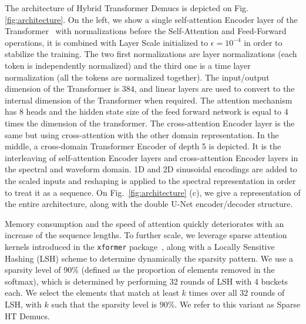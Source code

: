 \documentclass{article}
\begin{document}
The architecture of Hybrid Transformer Demucs is depicted on Fig.\ref{fig:architecture}. On the left, we show a single self-attention Encoder layer of the Transformer~\cite{transformer} with normalizations before the Self-Attention and Feed-Forward operations, it is combined with Layer Scale \cite{layerscale} initialized to $\epsilon{=}10^{-4}$ in order to stabilize the training. The two first normalizations are layer normalizations (each token is independently normalized) and the third one is a time layer normalization (all the tokens are normalized together). 
The input/output dimension of the Transformer is $384$, and linear layers are used to convert to the internal
dimension of the Transformer when required.
The attention mechanism has 8 heads and the hidden state size of the feed forward network is equal to 4 times the dimension of the transformer. The cross-attention Encoder layer is the same but using cross-attention with the other domain representation. In the middle, a cross-domain Transformer Encoder of depth 5 is depicted. It is the interleaving of self-attention Encoder layers and cross-attention Encoder layers in the spectral and waveform domain. 1D \cite{transformer} and 2D \cite{2Dpe} sinusoidal encodings are added to the scaled inputs and reshaping is applied to the spectral representation in order to treat it as a sequence. On Fig.~\ref{fig:architecture} (c), we give
a representation of the entire architecture, along with the double U-Net encoder/decoder structure.

Memory consumption and the speed of attention quickly deteriorates with an increase of the sequence lengths.
To further scale, we leverage sparse attention kernels introduced in the \texttt{xformer} package~\cite{xFormers2021},
along with a Locally Sensitive Hashing (LSH) scheme to determine dynamically the sparsity pattern. We use a sparsity level
of 90\% (defined as the proportion of elements removed in the softmax), which is determined by performing 32 rounds of LSH with 4 buckets each. We select the elements that match at least $k$ times over all 32 rounds of LSH, with $k$ such that the sparsity level is 90\%.
We refer to this variant as Sparse HT Demucs.
\end{document}
